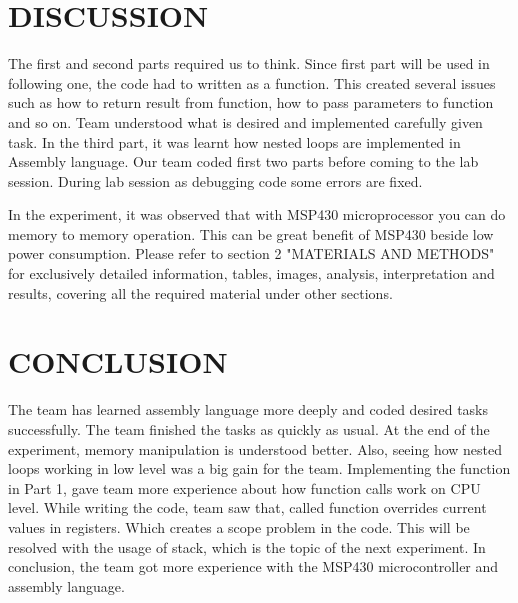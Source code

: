 \documentclass[pdftex,12pt,a4paper]{article}
\begin{document}

\section{DISCUSSION}
The first and second parts required us to think. Since first part will be used in following one, the code had to written as a function. This created several issues such as how to return result from function, how to pass parameters to function and so on. Team understood what is desired and implemented carefully given task. In the third part, it was learnt how nested loops are implemented in Assembly language. Our team coded first two parts before coming to the lab session. During lab session as debugging code some errors are fixed.

\newline
In the experiment, it was observed that with MSP430 microprocessor you can do memory to memory operation. This can be great benefit of MSP430 beside low power consumption.
\newline
Please refer to section 2 "MATERIALS AND METHODS" for exclusively detailed information, tables, images, analysis, interpretation and results, covering all the required material under other sections.
\section{CONCLUSION}
The team has learned assembly language more deeply and coded desired tasks successfully. The team finished the tasks as quickly as usual. At the end of the experiment, memory manipulation is understood better. Also, seeing how nested loops working in low level was a big gain for the team. Implementing the function in Part 1, gave team more experience about how function calls work on CPU level. While writing the code, team saw that, called function overrides current values in registers. Which creates a scope problem in the code. This will be resolved with the usage of stack, which is the topic of the next experiment.
\newline
In conclusion, the team got more experience with the MSP430 microcontroller and assembly language.



\nocite{overleaf}
\nocite{reportGuide}
\newpage
{}



\end{document}
